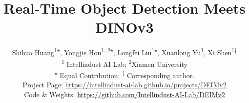 \documentclass[10pt,twocolumn,letterpaper]{article}
\title{Real-Time Object Detection Meets DINOv3}
\author{
Shihua Huang\textsuperscript{1\(\star\)}, 
Yongjie Hou\textsuperscript{1, 2\(\star\)}, 
Longfei Liu\textsuperscript{1\(\star\)}, 
Xuanlong Yu\textsuperscript{1}, 
Xi Shen\textsuperscript{1\(\dagger\)} \\[0.5em]
\textsuperscript{1} Intellindust AI Lab; 
\textsuperscript{2}Xiamen University
\\
\textsuperscript{\(\star\)} Equal Contribution; \textsuperscript{\(\dagger\)} Corresponding author.
\\[0.5em]
Project Page: \href{https://intellindust-ai-lab.github.io/projects/DEIMv2/}{ https://intellindust-ai-lab.github.io/projects/DEIMv2}
\\
Code \& Weights: \href{https://github.com/Intellindust-AI-Lab/DEIMv2}{ https://github.com/Intellindust-AI-Lab/DEIMv2}
}
\begin{document}


    





{
    \small
    
    
}
\end{document}
